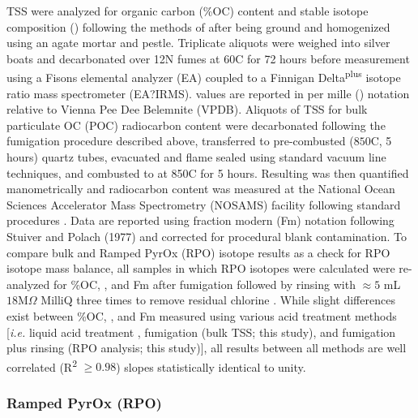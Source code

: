 TSS were analyzed for organic carbon (\%OC) content and stable isotope composition () following the methods of \citet{Whiteside:2011jea} after being ground and homogenized using an agate mortar and pestle. Triplicate aliquots were weighed into silver boats and decarbonated over 12N  fumes at $60$\textdegree C for 72 hours before measurement using a Fisons elemental analyzer (EA) coupled to a Finnigan Delta\textsuperscript{plus} isotope ratio mass spectrometer (EA?IRMS).  values are reported in per mille (\textperthousand) notation relative to Vienna Pee Dee Belemnite (VPDB). Aliquots of TSS for bulk particulate OC (POC) radiocarbon content were decarbonated following the fumigation procedure described above, transferred to pre-combusted ($850$\textdegree C, 5 hours) quartz tubes, evacuated and flame sealed using standard vacuum line techniques, and combusted to  at 850\textdegree C for 5 hours. Resulting  was then quantified manometrically and radiocarbon content was measured at the National Ocean Sciences Accelerator Mass Spectrometry (NOSAMS) facility following standard procedures \citep{McNichol:1994ty,Pearson:1998vy}. Data are reported using fraction modern (Fm) notation following Stuiver and Polach (1977) and corrected for procedural blank contamination. To compare bulk and Ramped PyrOx (RPO) isotope results as a check for RPO isotope mass balance, all samples in which RPO isotopes were calculated were re-analyzed for \%OC, , and Fm after fumigation followed by rinsing with $\approx 5$ mL $18$M$\Omega$ MilliQ  three times to remove residual chlorine \citep{Hemingway:2016bq}. While slight differences exist between \%OC, , and Fm measured using various acid treatment methods [\textit{i.e.} liquid acid treatment \citep[bulk soils;][]{Hilton:2010cg,Hilton:2013kq}, fumigation (bulk TSS; this study), and fumigation plus rinsing (RPO analysis; this study)], all results between all methods are well correlated (R\textsuperscript{2} $\geq 0.98$) slopes statistically identical to unity.

\subsubsection{Ramped PyrOx (RPO)}

